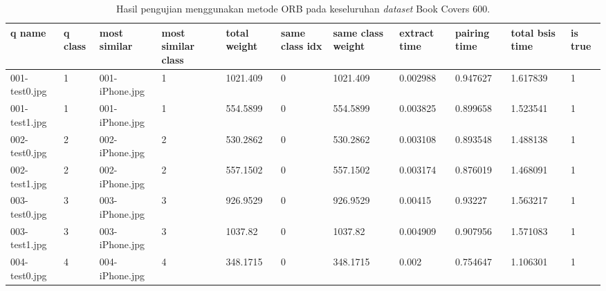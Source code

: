 \begin{landscape}
	\begin{longtable}{|p{2cm}|p{1cm}|p{2cm}|p{1cm}|p{2cm}|p{1cm}|p{2cm}|p{2cm}|p{2cm}|p{2cm}|p{1cm}|}
		\caption{Hasil pengujian menggunakan metode ORB pada keseluruhan \textit{dataset} Book Covers 600.} \\
		\hline
		\textbf{q name} & \textbf{q class} & \textbf{most similar} & \textbf{most similar class} & \textbf{total weight} & \textbf{same class idx} & \textbf{same class weight} & \textbf{extract time} & \textbf{pairing time} & \textbf{total bsis time} & \textbf{is true} \\ \hline
		001-test0.jpg   & 1                & 001-iPhone.jpg        & 1                           & 1021.409              & 0                       & 1021.409                   & 0.002988              & 0.947627              & 1.617839                 & 1                \\ \hline
		001-test1.jpg   & 1                & 001-iPhone.jpg        & 1                           & 554.5899              & 0                       & 554.5899                   & 0.003825              & 0.899658              & 1.523541                 & 1                \\ \hline
		002-test0.jpg   & 2                & 002-iPhone.jpg        & 2                           & 530.2862              & 0                       & 530.2862                   & 0.003108              & 0.893548              & 1.488138                 & 1                \\ \hline
		002-test1.jpg   & 2                & 002-iPhone.jpg        & 2                           & 557.1502              & 0                       & 557.1502                   & 0.003174              & 0.876019              & 1.468091                 & 1                \\ \hline
		003-test0.jpg   & 3                & 003-iPhone.jpg        & 3                           & 926.9529              & 0                       & 926.9529                   & 0.00415               & 0.93227               & 1.563217                 & 1                \\ \hline
		003-test1.jpg   & 3                & 003-iPhone.jpg        & 3                           & 1037.82               & 0                       & 1037.82                    & 0.004909              & 0.907956              & 1.571083                 & 1                \\ \hline
		004-test0.jpg   & 4                & 004-iPhone.jpg        & 4                           & 348.1715              & 0                       & 348.1715                   & 0.002                 & 0.754647              & 1.106301                 & 1                \\ \hline

\end{longtable}
\end{landscape}
